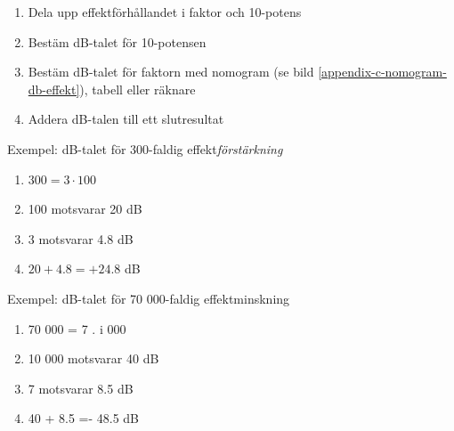 \begin{rev-raderas}



\begin{enumerate}
\item Dela upp effektförhållandet i faktor och 10-potens
\item Bestäm dB-talet för 10-potensen
\item Bestäm dB-talet för faktorn med nomogram (se bild
  \ref{appendix-c-nomogram-db-effekt}), tabell eller räknare
\item Addera dB-talen till ett slutresultat
\end{enumerate}

Exempel: dB-talet för 300-faldig effekt\emph{förstärkning}
\begin{enumerate}
\item \(300 = 3 \cdot 100\)
\item 100 motsvarar 20 dB
\item 3 motsvarar 4.8 dB
\item \(20 + 4.8 = +24.8\) dB
\end{enumerate}

Exempel: dB-talet för 70 000-faldig effektminskning
\begin{enumerate}
\item 70 000 = 7 . i 000
\item 10 000 motsvarar 40 dB
\item 7 motsvarar 8.5 dB
\item 40 + 8.5 =- 48.5 dB
\end{enumerate}


\end{rev-raderas}

